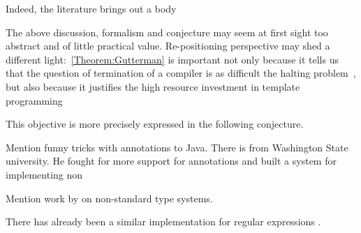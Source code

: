   

Indeed, the literature brings out a body  

The above discussion, formalism and conjecture may seem at first sight too abstract
  and of little practical value.
Re-positioning perspective may shed a different light:~\cref{Theorem:Gutterman} is important not only because it tells us
  that the question of termination of a \CC compiler is as difficult
  the halting problem~\cite{Turing:1936}, but also because it
  justifies the high resource investment in
  template programming

This objective is more precisely expressed in the following conjecture.


Mention funny tricks with annotations to Java. There is \cite{Papi:08} from 
  Washington State university. He fought for more support for annotations 
  and built a system for implementing non

Mention work by \cite{Bracha} on non-standard type systems.  

There has already been a similar \Java implementation for regular expressions
  .


